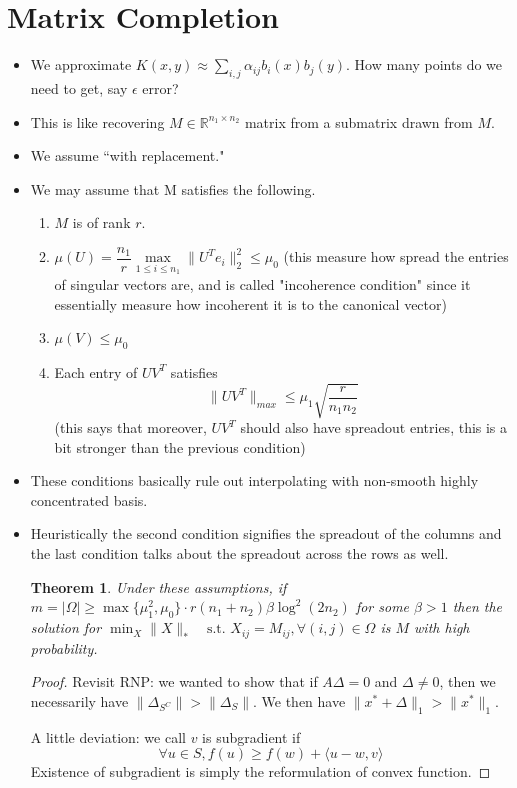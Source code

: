 \documentclass[11pt,reqno]{amsart}
\newtheorem{theorem}{Theorem}
\theoremstyle{remark}
\begin{document}
\begin{sloppypar}
\section*{Matrix Completion}
\begin{itemize}
\item We approximate $K(x,y)\approx\sum_{i,j}\alpha_{ij}b_i(x)b_j(y)$. 
How many points do we need to get, say $\epsilon$ error?
\item This is like recovering $M\in\mathbb{R}^{n_1\times n_2}$ matrix from a submatrix drawn from $M$.
\item We assume ``with replacement."
\item We may assume that M satisfies the following.
\begin{enumerate}
\item $M$ is of rank $r$.
\item $\mu(U)=\dfrac{n_1}r\max\limits_{1\leq i\leq n_1}\lVert U^T e_i\rVert^2_2\leq \mu_0$ (this measure how spread 
the entries of singular vectors are, and is called "incoherence condition" since it
essentially measure how incoherent it is to the canonical vector)
\item $\mu(V)\leq \mu_0$
\item Each entry of $UV^T$ satisfies
\[
\lVert UV^T\rVert_{max}\leq\mu_1\sqrt{\dfrac{r}{n_1n_2}}
\] (this says that moreover, $UV^T$ should also have spreadout entries, this is a bit stronger than the previous condition)
\end{enumerate}
\item These conditions basically rule out interpolating with non-smooth highly concentrated basis.
\item Heuristically the second condition signifies the spreadout of the columns and the last condition talks about the spreadout
across the rows as well.
\begin{theorem}
Under these assumptions, if $m=\lvert\Omega\rvert\geq\max\{\mu_1^2, \mu_0\}\cdot r(n_1+n_2)\beta\log^2(2n_2)$ for 
some $\beta>1$ then the solution for $\min_X\lVert X\rVert_*\quad\text{s.t. }X_{ij}=M_{ij}, \forall (i,j)\in\Omega$ is $M$ with 
high probability.
\end{theorem}
\begin{proof}
Revisit RNP: we wanted to show that if $A\Delta=0$ and $\Delta\neq 0$, then we necessarily have $\lVert \Delta_{S^C}\rVert>\lVert \Delta_S\rVert$.
We then have $\lVert x^*+\Delta\rVert_1>\lVert x^*\rVert_1$.

A little deviation: we call $v$ is subgradient if
\[
\forall u\in S, f(u)\geq f(w)+\langle u-w, v\rangle
\]
Existence of subgradient is simply the reformulation of convex function.


\end{proof}
\end{itemize}
\end{sloppypar}
\end{document}
